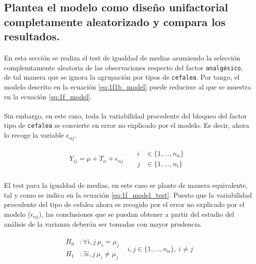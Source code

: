 \documentclass[11pt]{article}
\begin{document}
    \subsection{Plantea el modelo como diseño unifactorial completamente aleatorizado y compara los resultados.}

      \paragraph{}
      En esta sección se realiza el test de igualdad de medias asumiendo la selección complemtamente aleatoria de las observaciones respecto del factor \texttt{analgésico}, de tal manera que se ignora la agrupación por tipos de \texttt{cefalea}. Por tango, el modelo descrito en la ecuación \eqref{eq:1f1b_model} puede reducirse al que se muestra en la ecuación \eqref{eq:1f_model}.

      \paragraph{}
      Sin embargo, en este caso, toda la variabilidad procedente del bloqueo del factor tipo de \texttt{cefalea} se convierte en error no explicado por el modelo. Es decir, ahora lo recoge la variable $\epsilon_{\alpha j}$.

      \begin{align}
      \label{eq:1f_model}
        Y_{ij} = \mu + T_\alpha + \epsilon_{\alpha j}  &&
        \begin{split}
          i &\in \{1,...,n_\alpha\}\\
          j &\in \{1, ..., n_i\}
        \end{split}
      \end{align}

      \paragraph{}
      El test para la igualdad de medias, en este caso se plante de manera equivalente, tal y como se indica en la ecuación \eqref{eq:1f_model_test}. Puesto que la variabilidad procedente del tipo de cefalea ahora es recogido por el error no explicado por el modelo ($\epsilon_{\alpha j}$), las conclusiones que se puedan obtener a partir del estudio del análisis de la varianza deberán ser tomadas con mayor prudencia.

      \begin{align}
      \label{eq:1f_model_test}
        \begin{split}
          H_0 &: \forall i,j \ \mu_i = \mu_j  \\
          H_1 &: \exists i,j \ \mu_i \neq \mu_j
        \end{split} &
        i,j\in \{1,...,n_\alpha\}, \ i \neq j
      \end{align}
\end{document}
